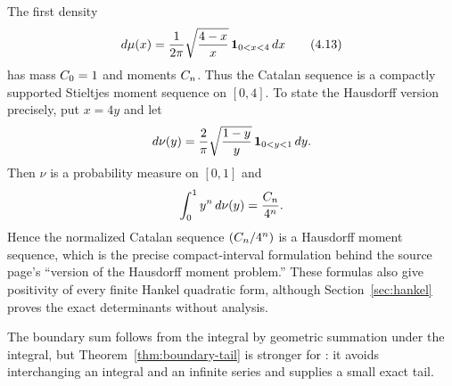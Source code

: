 The first density
\[
 d\mu(x)=\frac1{2\pi}\sqrt{\frac{4-x}{x}}\,\mathbf 1_{0<x<4}\,dx       \tag{4.13}\label{eq:moment-density}
\]
has mass $C_0=1$ and moments $C_n$.  Thus the Catalan sequence is a
compactly supported Stieltjes moment sequence on $[0,4]$.  To state the
Hausdorff version precisely, put $x=4y$ and let
\[
 d\nu(y)=\frac2\pi\sqrt{\frac{1-y}{y}}\,\mathbf 1_{0<y<1}\,dy.
\]
Then $\nu$ is a probability measure on $[0,1]$ and
\[
 \int_0^1 y^n\,d\nu(y)=\frac{C_n}{4^n}.
\]
Hence the normalized Catalan sequence $(C_n/4^n)$ is a Hausdorff moment
sequence, which is the precise compact-interval formulation behind the source
page's ``version of the Hausdorff moment problem.''  These formulas also give
positivity of every finite Hankel quadratic form, although
Section~\ref{sec:hankel} proves the exact determinants without analysis.

The boundary sum follows from the integral by geometric summation under the
integral, but Theorem~\ref{thm:boundary-tail} is stronger for \ipra: it avoids
interchanging an integral and an infinite series and supplies a small exact
tail.
